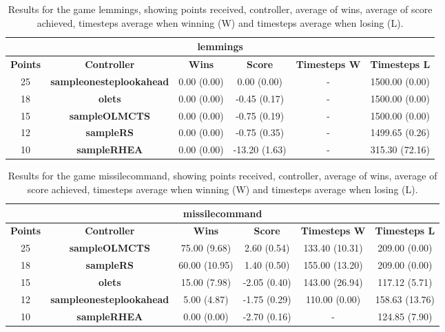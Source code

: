 \begin{table*}[!t]
\begin{center}
\begin{tabular}{|c|c|c|c|c|c|}
\multicolumn{6}{c}{\textbf{lemmings}}\\
\hline
\textbf{Points} & \textbf{Controller} & \textbf{Wins} &  \textbf{Score} & \textbf{Timesteps W} & \textbf{Timesteps L}\\
\hline
25 & \textbf{sampleonesteplookahead} & 0.00 (0.00) & 0.00 (0.00) &  -  & 1500.00 (0.00)
 \\
\hline
18 & \textbf{olets} & 0.00 (0.00) & -0.45 (0.17) &  -  & 1500.00 (0.00)
 \\
\hline
15 & \textbf{sampleOLMCTS} & 0.00 (0.00) & -0.75 (0.19) &  -  & 1500.00 (0.00)
 \\
\hline
12 & \textbf{sampleRS} & 0.00 (0.00) & -0.75 (0.35) &  -  & 1499.65 (0.26)
 \\
\hline
10 & \textbf{sampleRHEA} & 0.00 (0.00) & -13.20 (1.63) &  -  & 315.30 (72.16)
 \\
\hline
\end{tabular}
\caption{Results for the game lemmings, showing points received, controller, average of wins, average of score achieved, timesteps average when winning (W) and timesteps average when losing (L).}
\label{tab:weights}
\end{center}
\end{table*}
\begin{table*}[!t]
\begin{center}
\begin{tabular}{|c|c|c|c|c|c|}
\multicolumn{6}{c}{\textbf{missilecommand}}\\
\hline
\textbf{Points} & \textbf{Controller} & \textbf{Wins} &  \textbf{Score} & \textbf{Timesteps W} & \textbf{Timesteps L}\\
\hline
25 & \textbf{sampleOLMCTS} & 75.00 (9.68) & 2.60 (0.54) & 133.40 (10.31) & 209.00 (0.00)
 \\
\hline
18 & \textbf{sampleRS} & 60.00 (10.95) & 1.40 (0.50) & 155.00 (13.20) & 209.00 (0.00)
 \\
\hline
15 & \textbf{olets} & 15.00 (7.98) & -2.05 (0.40) & 143.00 (26.94) & 117.12 (5.71)
 \\
\hline
12 & \textbf{sampleonesteplookahead} & 5.00 (4.87) & -1.75 (0.29) & 110.00 (0.00) & 158.63 (13.76)
 \\
\hline
10 & \textbf{sampleRHEA} & 0.00 (0.00) & -2.70 (0.16) &  -  & 124.85 (7.90)
 \\
\hline
\end{tabular}
\caption{Results for the game missilecommand, showing points received, controller, average of wins, average of score achieved, timesteps average when winning (W) and timesteps average when losing (L).}
\label{tab:weights}
\end{center}
\end{table*}

